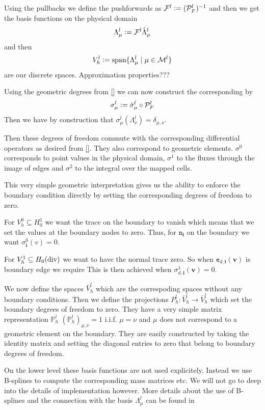 \documentclass[../master_thesis.tex]{subfiles}
\begin{document}
Using the pullbacks we define the pushforwards as 
$\mathcal{F}^l \vcentcolon= (\mathcal{P}_F^l)^{-1}$ and then 
we get the basis functions on the physical domain
\begin{align*}
    \Lambda^l_{\mu} \vcentcolon= \mathcal{F}^l \hat{\Lambda}^l_{\mu}
\end{align*}
and then 
\begin{align*}
    V_h^l \vcentcolon= \text{span} \{ \Lambda^l_{\mu} \mid \mu \in \mathcal{M}^l \}
\end{align*}
are our discrete spaces. {\color{red} Approximation properties???}

Using the geometric degrees from \ref{} we can now construct the corresponding 
by 
\begin{align*}
    \sigma^l_\mu \vcentcolon= \hat{\sigma}_\mu^l \circ \mathcal{P}_F^l
\end{align*}
Then we have by construction that 
$\sigma^l_\mu(\Lambda^l_{\nu}) = \delta_{\mu,\nu}$. 

Then these degrees of freedom commute with the corresponding differential operators 
as desired from \ref{}. They also correspond to geometric elements. 
$\sigma^0$ corresponds to point values in the physical domain, 
$\sigma^1$ to the fluxes through the image of edges and 
$\sigma^2$ to the integral over the mapped cells.

This very simple geometric interpretation gives us the ability to enforce 
the boundary condition directly by setting the corresponding degrees of freedom 
to zero. 

For $V_h^0 \subseteq H^1_0$ we want the trace on the boundary to vanish which 
means that we set the values at the boundary nodes to zero. Thus, 
for $\mathtt{n}_\mathbf{i}$ on the boundary we want 
$\sigma^0_{\mathbf{i}}(v) = 0$. 

For $V_h^1 \subseteq H_0(\operatorname{div})$ we want to have the normal trace zero. 
So when $\mathtt{e}_{d,\mathbf{i}}(\mathbf{v})$ is boundary edge we require
This is then achieved when $\sigma^1_{d,\mathbf{i}} (\mathbf{v}) = 0$.

We now define the spaces $\bar{V}_h^l$ which are the correspoding spaces 
without any boundary conditions. Then we define the 
projections $P_h^l: \bar{V}_h^l \rightarrow \bar{V}_h^l$ which set 
the boundary degrees of freedom to zero. They have a very simple 
matrix representation $\mathbb{P}_h^l$ 
$(\mathbb{P}_h^l)_{\mu, \nu} = 1 $ i.i.f. $\mu = \nu$ and $\mu$ does not 
correspond to a geometric element on the boundary. They are easily constructed 
by taking the identity matrix and setting the diagonal entries to zero that 
belong to boundary degrees of freedom.

On the lower level these basis functions are not used explicitely. Instead 
we use B-splines to compute the corresponding mass matrices etc. We will not 
go to deep into the details of implementation however. More details about the 
use of B-splines and the connection with the basis $\Lambda^l_\mu$ can be found 
in \cite[Sec.\,4.8]{multipatch_paper} 

\
\end{document}
